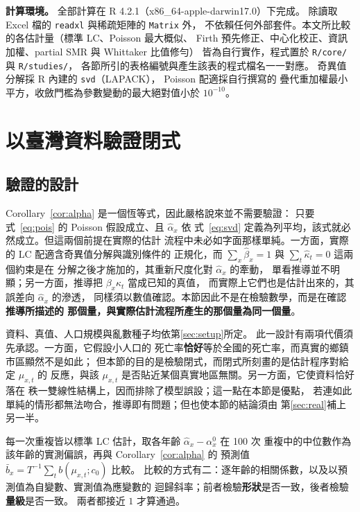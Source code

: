 \documentclass[UTF8, fontset=macnew, a4paper, 12pt]{ctexart}
\begin{document}
\textbf{計算環境。} 全部計算在 R 4.2.1（x86\_64-apple-darwin17.0）下完成。
除讀取 Excel 檔的 \texttt{readxl} 與稀疏矩陣的 \texttt{Matrix} 外，
不依賴任何外部套件。本文所比較的各估計量（標準 LC、Poisson 最大概似、
Firth 預先修正、中心化校正、資訊加權、partial SMR 與 Whittaker 比值修勻）
皆為自行實作，程式置於 \texttt{R/core/} 與 \texttt{R/studies/}，
各節所引的表格編號與產生該表的程式檔名一一對應。
奇異值分解採 R 內建的 \texttt{svd}（LAPACK）， Poisson 配適採自行撰寫的
疊代重加權最小平方，收斂門檻為參數變動的最大絕對值小於 $10^{-10}$。

\section{以臺灣資料驗證閉式}\label{sec:valid}

\subsection{驗證的設計}

Corollary~\ref{cor:alpha} 是一個恆等式，因此嚴格說來並不需要驗證：
只要式~\eqref{eq:pois} 的 Poisson 假設成立、且 $\hat\alpha_x$ 依
式~\eqref{eq:svd} 定義為列平均，該式就必然成立。但這兩個前提在實際的估計
流程中未必如字面那樣單純。一方面，實際的 LC 配適含奇異值分解與識別條件的
正規化，而 $\sum_x\hat\beta_x=1$ 與 $\sum_t\hat\kappa_t=0$ 這兩個約束是在
分解之後才施加的，其重新尺度化對 $\hat\alpha_x$ 的牽動，
單看推導並不明顯；另一方面，推導把 $\beta_x\kappa_t$ 當成已知的真值，
而實際上它們也是估計出來的，其誤差向 $\hat\alpha_x$ 的滲透，
同樣須以數值確認。本節因此不是在檢驗數學，而是在確認\textbf{推導所描述的
那個量，與實際估計流程所產生的那個量為同一個量}。

資料、真值、人口規模與亂數種子均依第\ref{sec:setup}所定。
此一設計有兩項代價須先承認。一方面，它假設小人口的
死亡率\textbf{恰好}等於全國的死亡率，而真實的鄉鎮市區顯然不是如此；
但本節的目的是檢驗閉式，而閉式所刻畫的是估計程序對給定 $\mu_{x,t}$ 的
反應，與該 $\mu_{x,t}$ 是否貼近某個真實地區無關。另一方面，它使資料恰好落在
秩一雙線性結構上，因而排除了模型誤設；這一點在本節是優點，
若連如此單純的情形都無法吻合，推導即有問題；但也使本節的結論須由
第\ref{sec:real}補上另一半。

每一次重複皆以標準 LC 估計，取各年齡 $\hat\alpha_x-\alpha^{0}_x$ 在 100 次
重複中的中位數作為該年齡的實測偏誤，再與 Corollary~\ref{cor:alpha} 的
預測值 $\bar b_x=T^{-1}\sum_t b(\mu_{x,t};c_0)$ 比較。
比較的方式有二：逐年齡的相關係數，以及以預測值為自變數、實測值為應變數的
迴歸斜率；前者檢驗\textbf{形狀}是否一致，後者檢驗\textbf{量級}是否一致。
兩者都接近 $1$ 才算通過。
\end{document}

